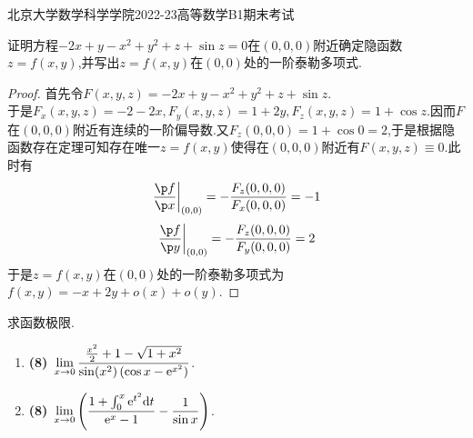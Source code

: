 \documentclass{ctexart}
\begin{document}
\pagestyle{empty}
\begin{center}\Large
    北京大学数学科学学院2022-23高等数学B1期末考试
\end{center}
\begin{problem}[1.(14\songti{分})]
    证明方程$-2x+y-x^2+y^2+z+\sin z=0$在$(0,0,0)$附近确定隐函数$z=f(x,y)$,并写出$z=f(x,y)$在$(0,0)$处的一阶泰勒多项式.
\end{problem}
\begin{proof}
    首先令$F(x,y,z)=-2x+y-x^2+y^2+z+\sin z$.\\
    于是$F_x(x,y,z)=-2-2x,F_y(x,y,z)=1+2y,F_z(x,y,z)=1+\cos z$.因而$F$在$(0,0,0)$附近有连续的一阶偏导数.又$F_z(0,0,0)=1+\cos 0=2$,于是根据隐函数存在定理可知存在唯一$z=f(x,y)$使得在$(0,0,0)$附近有$F(x,y,z)\equiv0$.此时有
    \[\left.\dfrac{\p f}{\p x}\right|_{(0,0)}=-\dfrac{F_z(0,0,0)}{F_x(0,0,0)}=-1\]
    \[\left.\dfrac{\p f}{\p y}\right|_{(0,0)}=-\dfrac{F_z(0,0,0)}{F_y(0,0,0)}=2\]
    于是$z=f(x,y)$在$(0,0)$处的一阶泰勒多项式为$f(x,y)=-x+2y+o(x)+o(y)$.
\end{proof}
\begin{problem}[2.(16\songti{分})]
    求函数极限.
    \begin{enumerate}[label=\textbf{(\arabic*)},leftmargin=*]
        \item \textbf{(8)}\ $\displaystyle\lim_{x\to0}\dfrac{\frac{x^2}{2}+1-\sqrt{1+x^2}}{\sin(x^2)\left(\cos x-\mathrm{e}^{x^2}\right)}$.
        \item \textbf{(8)}\ $\displaystyle\lim_{x\to0}\left(\dfrac{1+\int_0^x\mathrm{e}^{t^2}\mathrm{d} t}{\mathrm{e}^x-1}-\dfrac{1}{\sin x}\right)$.
    \end{enumerate}
\end{problem}
\end{document}
